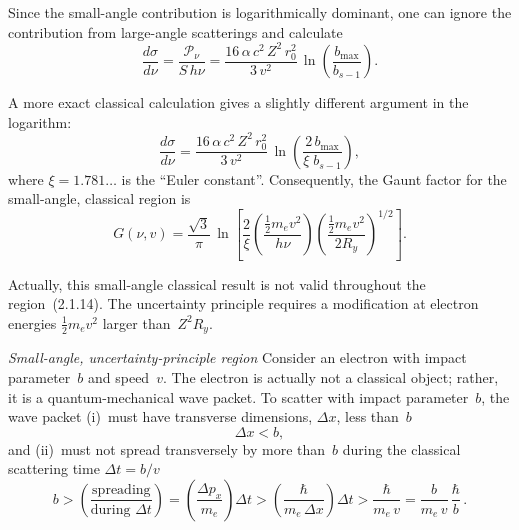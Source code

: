 Since the small-angle contribution is logarithmically dominant, one can
ignore the contribution from large-angle scatterings and calculate
\begin{equation}
  \frac{d\sigma}{d\nu}
  = \frac{\mathscr{P}_\nu}{S\,h\nu}
  = \frac{16\,\alpha\,c^{2}\,Z^{2}\,r_0^{2}}{3\,v^{2}}\,
    \ln\!\left(\frac{b_{\max}}{b_{s-1}}\right).
  \tag{2.1.16}
\end{equation}

\noindent A more exact classical calculation gives a slightly different
argument in the logarithm:
\begin{equation}
  \frac{d\sigma}{d\nu}
  = \frac{16\,\alpha\,c^{2}\,Z^{2}\,r_0^{2}}{3\,v^{2}}\,
    \ln\!\left(\frac{2\,b_{\max}}{\xi\;b_{s-1}}\right),
  \tag{2.1.18}
\end{equation}
where $\xi = 1.781\ldots$ is the ``Euler constant''.  Consequently, the
Gaunt factor for the small-angle, classical region is
\begin{equation}
  G(\nu,v)
  = \frac{\sqrt{3}}{\pi}\,
    \ln\!\left[
      \frac{2}{\xi}
      \left(\frac{\tfrac{1}{2}m_e v^{2}}{h\nu}\right)
      \left(\frac{\tfrac{1}{2}m_e v^{2}}{2R_y}\right)^{\!1/2}
    \right].
  \tag{2.1.19}
\end{equation}

Actually, this small-angle classical result is not valid throughout the
region~(2.1.14).  The uncertainty principle requires a modification at
electron energies $\tfrac{1}{2}m_e v^{2}$ larger than~$Z^{2}R_y$.


\bigskip
\noindent\textit{Small-angle, uncertainty-principle region}\quad
Consider an electron with impact parameter~$b$ and speed~$v$.  The
electron is actually not a classical object; rather, it is a
quantum-mechanical wave packet.  To scatter with impact parameter~$b$,
the wave packet (i)~must have transverse dimensions, $\Delta x$, less
than~$b$
\begin{equation}
  \Delta x < b,
\end{equation}
and (ii)~must not spread transversely by more than~$b$ during the
classical scattering time $\Delta t = b/v$
\begin{equation}
  b > \left(\frac{\text{spreading}}{\text{during }\Delta t}\right)
  = \left(\frac{\Delta p_x}{m_e}\right)\Delta t
  > \left(\frac{\hbar}{m_e\,\Delta x}\right)\Delta t
  > \frac{\hbar}{m_e\,v}
  = \frac{b}{m_e\,v}\,\frac{\hbar}{b}\,.
\end{equation}

